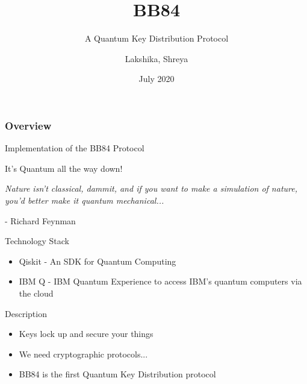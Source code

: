 \documentclass{beamer}
\title[BB84]{BB84}
\subtitle{A Quantum Key Distribution Protocol}
\author[Team 37]{Lakshika, Shreya}
\date{July 2020}
\begin{document}
\begin{frame}
	\titlepage
\end{frame}

\begin{frame}
	\frametitle{Overview}
	 Implementation of the BB84 Protocol
\end{frame}


\begin{frame}{It's Quantum all the way down!}
    \begin{center}
        \emph{Nature isn’t classical, dammit, and if you want to make a simulation of nature, you’d better make it quantum mechanical...}
    \end{center}
    \begin{flushright}
        - Richard Feynman
    \end{flushright}
\end{frame}


\begin{frame}{Technology Stack}
	\begin{itemize}
		\item Qiskit - An SDK for Quantum Computing
		\item IBM Q - IBM Quantum Experience to access IBM's quantum computers via the cloud
	\end{itemize}
\end{frame}

\begin{frame}{Description}
    \begin{itemize}[<+->] 
        \item Keys lock up and secure your things
        \item We need cryptographic protocols...
        \item BB84 is the first Quantum Key Distribution protocol
    \end{itemize}
\end{frame}
\end{document}

